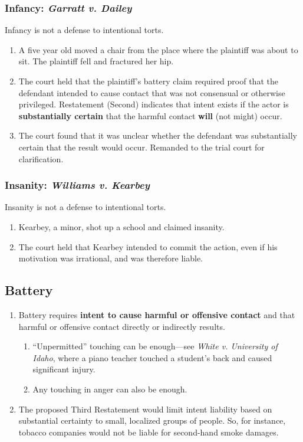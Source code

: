 \subsubsection{Infancy: \emph{Garratt v. Dailey}}

Infancy is not a defense to intentional torts.

\begin{enumerate}
    \item A five year old moved a chair from the place where the plaintiff was 
    about to sit. The plaintiff fell and fractured her hip.
    \item The court held that the plaintiff's battery claim required proof 
    that the defendant intended to cause contact that was not consensual or 
    otherwise privileged. Restatement (Second) indicates that intent exists if 
    the actor is \textbf{substantially certain} that the harmful contact 
    \textbf{will} (not might) occur.
    \item The court found that it was unclear whether the defendant was 
    substantially certain that the result would occur. Remanded to the trial 
    court for clarification.
\end{enumerate}

\subsubsection{Insanity: \emph{Williams v. Kearbey}}

Insanity is not a defense to intentional torts.

\begin{enumerate}
    \item Kearbey, a minor, shot up a school and claimed insanity.
    \item The court held that Kearbey intended to commit the action, even if 
    his motivation was irrational, and was therefore liable.
\end{enumerate}

\subsection{Battery}

\begin{enumerate}
    \item Battery requires \textbf{intent to cause harmful or offensive 
    contact} and that harmful or offensive contact directly or indirectly 
    results.
    \begin{enumerate}
        \item ``Unpermitted'' touching can be enough---see \emph{White v. 
        University of Idaho}, where a piano teacher touched a student's back 
        and caused significant injury.
        \item Any touching in anger can also be enough.
    \end{enumerate}
    \item The proposed Third Restatement would limit intent liability based on 
    substantial certainty to small, localized groups of people. So, for 
    instance, tobacco companies would not be liable for second-hand smoke 
    damages.
\end{enumerate}

